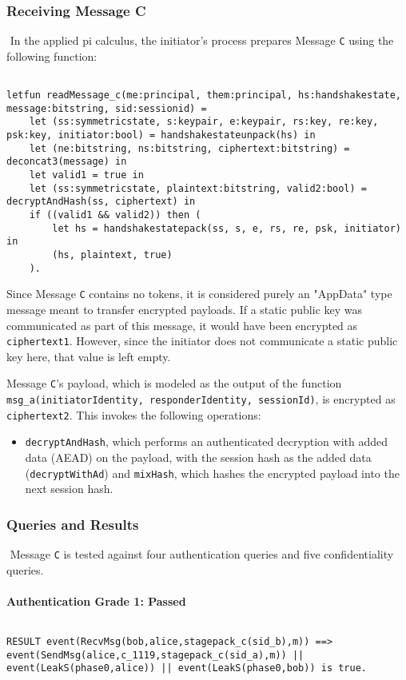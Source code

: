 \subsubsection{Receiving Message C}$ $
In the applied pi calculus, the initiator's process prepares Message \texttt{C} using the following function:


\begin{lstlisting}

letfun readMessage_c(me:principal, them:principal, hs:handshakestate, message:bitstring, sid:sessionid) =
	let (ss:symmetricstate, s:keypair, e:keypair, rs:key, re:key, psk:key, initiator:bool) = handshakestateunpack(hs) in
	let (ne:bitstring, ns:bitstring, ciphertext:bitstring) = deconcat3(message) in
	let valid1 = true in
	let (ss:symmetricstate, plaintext:bitstring, valid2:bool) = decryptAndHash(ss, ciphertext) in
	if ((valid1 && valid2)) then (
		let hs = handshakestatepack(ss, s, e, rs, re, psk, initiator) in
		(hs, plaintext, true)
	).

\end{lstlisting}

Since Message \texttt{C} contains no tokens, it is considered purely an "AppData" type message meant to transfer encrypted payloads.
If a static public key was communicated as part of this message, it would have been encrypted as \texttt{ciphertext1}. However, since the initiator does not communicate a static public key here, that value is left empty.


Message \texttt{C}'s payload, which is modeled as the output of the function \texttt{msg\_a(initiatorIdentity, responderIdentity, sessionId)}, is encrypted as \texttt{ciphertext2}. This invokes the following operations:


\begin{itemize}

\item \texttt{decryptAndHash}, which performs an authenticated decryption with added data (AEAD) on the payload, with the session hash as the added data (\texttt{decryptWithAd}) and \texttt{mixHash}, which hashes the encrypted payload into the next session hash.

\end{itemize}
\subsubsection{Queries and Results}$ $
Message \texttt{C} is tested against four authentication queries and five confidentiality queries.
\paragraph{Authentication Grade 1: Passed}$ $
\begin{lstlisting}
RESULT event(RecvMsg(bob,alice,stagepack_c(sid_b),m)) ==> event(SendMsg(alice,c_1119,stagepack_c(sid_a),m)) || event(LeakS(phase0,alice)) || event(LeakS(phase0,bob)) is true.
\end{lstlisting}

